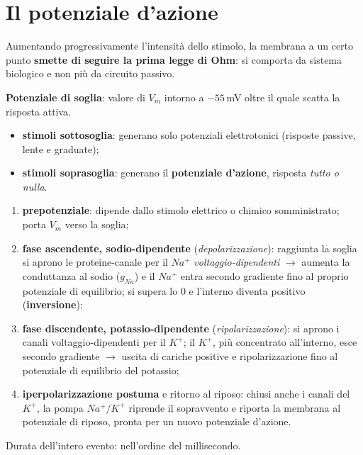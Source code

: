 \section{Il potenziale d'azione}

Aumentando progressivamente l'intensità dello stimolo, la membrana a un certo punto \textbf{smette
di seguire la prima legge di Ohm}: si comporta da sistema biologico e non più da circuito passivo.

\textbf{Potenziale di soglia}: valore di $V_m$ intorno a $-55$\,mV oltre il quale scatta la risposta
attiva.
\begin{itemize}
  \item \textbf{stimoli sottosoglia}: generano solo potenziali elettrotonici (risposte passive,
    lente e graduate);
  \item \textbf{stimoli soprasoglia}: generano il \textbf{potenziale d'azione}, risposta
    \textit{tutto o nulla}.
\end{itemize}

\begin{enumerate}
  \item \textbf{prepotenziale}: dipende dallo stimolo elettrico o chimico somministrato; porta
    $V_m$ verso la soglia;
  \item \textbf{fase ascendente, sodio-dipendente} (\textit{depolarizzazione}): raggiunta la soglia
    si aprono le proteine-canale per il $Na^+$ \textit{voltaggio-dipendenti} $\rightarrow$ aumenta
    la conduttanza al sodio ($g_{Na}$) e il $Na^+$ entra secondo gradiente fino al proprio
    potenziale di equilibrio; si supera lo 0 e l'interno diventa positivo (\textbf{inversione});
  \item \textbf{fase discendente, potassio-dipendente} (\textit{ripolarizzazione}): si aprono i
    canali voltaggio-dipendenti per il $K^+$; il $K^+$, più concentrato all'interno, esce secondo
    gradiente $\rightarrow$ uscita di cariche positive e ripolarizzazione fino al potenziale di
    equilibrio del potassio;
  \item \textbf{iperpolarizzazione postuma} e ritorno al riposo: chiusi anche i canali del $K^+$,
    la pompa $Na^+/K^+$ riprende il sopravvento e riporta la membrana al potenziale di riposo,
    pronta per un nuovo potenziale d'azione.
\end{enumerate}
Durata dell'intero evento: nell'ordine del millisecondo.

